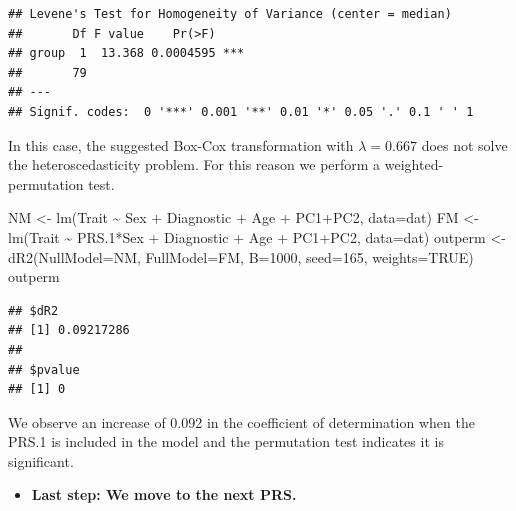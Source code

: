 \documentclass[
]{article}
\newenvironment{Shaded}{\begin{snugshade}}{\end{snugshade}}
\newcommand{\AttributeTok}[1]{\textcolor[rgb]{0.77,0.63,0.00}{#1}}
\newcommand{\ConstantTok}[1]{\textcolor[rgb]{0.00,0.00,0.00}{#1}}
\newcommand{\DecValTok}[1]{\textcolor[rgb]{0.00,0.00,0.81}{#1}}
\newcommand{\FloatTok}[1]{\textcolor[rgb]{0.00,0.00,0.81}{#1}}
\newcommand{\FunctionTok}[1]{\textcolor[rgb]{0.00,0.00,0.00}{#1}}
\newcommand{\NormalTok}[1]{#1}
\newcommand{\OtherTok}[1]{\textcolor[rgb]{0.56,0.35,0.01}{#1}}
\newcommand{\SpecialCharTok}[1]{\textcolor[rgb]{0.00,0.00,0.00}{#1}}
\providecommand{\tightlist}{%
  \setlength{\itemsep}{0pt}\setlength{\parskip}{0pt}}
\begin{document}
\begin{verbatim}
## Levene's Test for Homogeneity of Variance (center = median)
##       Df F value    Pr(>F)    
## group  1  13.368 0.0004595 ***
##       79                      
## ---
## Signif. codes:  0 '***' 0.001 '**' 0.01 '*' 0.05 '.' 0.1 ' ' 1
\end{verbatim}

In this case, the suggested Box-Cox transformation with
\(\lambda = 0.667\) does not solve the heteroscedasticity problem. For
this reason we perform a weighted-permutation test.

\begin{Shaded}
\begin{Highlighting}[]
\NormalTok{NM }\OtherTok{\textless{}{-}} \FunctionTok{lm}\NormalTok{(Trait }\SpecialCharTok{\textasciitilde{}}\NormalTok{ Sex }\SpecialCharTok{+}\NormalTok{ Diagnostic }\SpecialCharTok{+}\NormalTok{ Age }\SpecialCharTok{+}\NormalTok{ PC1}\SpecialCharTok{+}\NormalTok{PC2, }\AttributeTok{data=}\NormalTok{dat)}
\NormalTok{FM }\OtherTok{\textless{}{-}} \FunctionTok{lm}\NormalTok{(Trait }\SpecialCharTok{\textasciitilde{}}\NormalTok{ PRS}\FloatTok{.1}\SpecialCharTok{*}\NormalTok{Sex }\SpecialCharTok{+}\NormalTok{ Diagnostic }\SpecialCharTok{+}\NormalTok{ Age }\SpecialCharTok{+}\NormalTok{ PC1}\SpecialCharTok{+}\NormalTok{PC2, }\AttributeTok{data=}\NormalTok{dat)}
\NormalTok{outperm }\OtherTok{\textless{}{-}} \FunctionTok{dR2}\NormalTok{(}\AttributeTok{NullModel=}\NormalTok{NM, }\AttributeTok{FullModel=}\NormalTok{FM, }\AttributeTok{B=}\DecValTok{1000}\NormalTok{, }\AttributeTok{seed=}\DecValTok{165}\NormalTok{,  }\AttributeTok{weights=}\ConstantTok{TRUE}\NormalTok{)}
\NormalTok{outperm}
\end{Highlighting}
\end{Shaded}

\begin{verbatim}
## $dR2
## [1] 0.09217286
## 
## $pvalue
## [1] 0
\end{verbatim}

We observe an increase of 0.092 in the coefficient of determination when
the PRS.1 is included in the model and the permutation test indicates it
is significant.

\begin{itemize}
\tightlist
\item
  \textbf{Last step: We move to the next PRS.}
\end{itemize}
\end{document}
